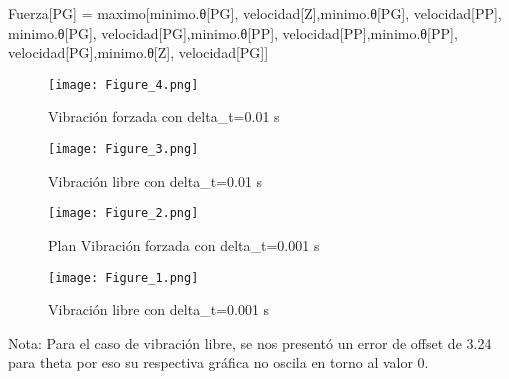 \documentclass{article}
\begin{document}
Fuerza[PG] = maximo[minimo.θ[PG], velocidad[Z],minimo.θ[PG], velocidad[PP],\\minimo.θ[PG], velocidad[PG],minimo.θ[PP], velocidad[PP],minimo.θ[PP], velocidad[PG],minimo.θ[Z], velocidad[PG]]\\

\begin{figure}[ht]
    \centering
    \texttt{[image: Figure\_4.png]}
    \caption{Vibración forzada con delta_t=0.01 s}
    \label{fig:TP2_ej3_0}
\end{figure}

\begin{figure}[ht]
    \centering
    \texttt{[image: Figure\_3.png]}
    \caption{Vibración libre con delta_t=0.01 s}
    \label{fig:TP2_ej3_1}
\end{figure}

\begin{figure}[ht]
    \centering
    \texttt{[image: Figure\_2.png]}
    \caption{Plan Vibración forzada con delta_t=0.001 s}
    \label{fig:TP2_ej3_2}
\end{figure}

\begin{figure}[ht]
    \centering
    \texttt{[image: Figure\_1.png]}
    \caption{Vibración libre con delta_t=0.001 s}
    \label{fig:TP2_ej3_3}
\end{figure}

Nota: Para el caso de vibración libre, se nos presentó un error de offset de 3.24 para theta por eso su respectiva gráfica no oscila en torno al valor 0.
\end{document}
